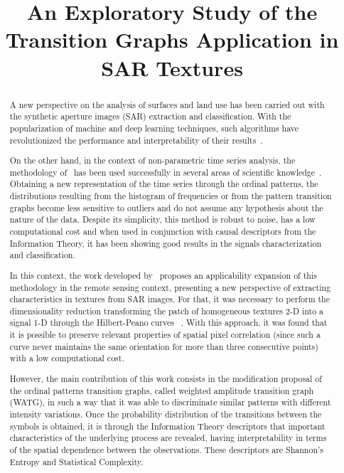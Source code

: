 \documentclass{article}
\title{\textbf{An Exploratory Study of the Transition Graphs Application in SAR Textures}}
\begin{document}
\maketitle

\begin{abstract}

A new perspective on the analysis of surfaces and land use has been carried out with the synthetic aperture images (SAR) extraction and classification.
With the popularization of machine and deep learning techniques, such algorithms have revolutionized the performance and interpretability of their results~\cite{han2020unsupervised, huang2020classification, xie2020polsar}.

On the other hand, in the context of non-parametric time series analysis, the methodology of~\cite{PermutationEntropyBandtPompe} has been used successfully in several areas of scientific knowledge~\cite{baravalle2018discriminating, Araujo2019permutation, ClassificationVerificationOnlineHandwrittenSignatures}.
Obtaining a new representation of the time series through the ordinal patterns, the distributions resulting from the histogram of frequencies or from the pattern transition graphs become less sensitive to outliers and do not assume any hypothesis about the nature of the data.
Despite its simplicity, this method is robust to noise, has a low computational cost and when used in conjunction with causal descriptors from the Information Theory, it has been showing good results in the signals characterization and classification.

In this context, the work developed by~\cite{ChagasClassification2020} proposes an applicability expansion of this methodology in the remote sensing context, presenting a new perspective of extracting characteristics in textures from SAR images.
For that, it was necessary to perform the dimensionality reduction transforming the patch of homogeneous textures \mbox{2-D} into a signal \mbox{1-D} through the Hilbert-Peano curves~\cite{Lee1994Texture} .
With this approach, it was found that it is possible to preserve relevant properties of spatial pixel correlation (since such a curve never maintains the same orientation for more than three consecutive points) with a low computational cost.

However, the main contribution of this work consists in the modification proposal of the ordinal patterns transition graphs, called weighted amplitude transition graph (WATG), in such a way that it was able to discriminate similar patterns with different intensity variations.
Once the probability distribution of the transitions between the symbols is obtained, it is through the Information Theory descriptors that important characteristics of the underlying process are revealed, having interpretability in terms of the spatial dependence between the observations.
These descriptors are Shannon's Entropy and Statistical Complexity.


\end{abstract}
\end{document}
